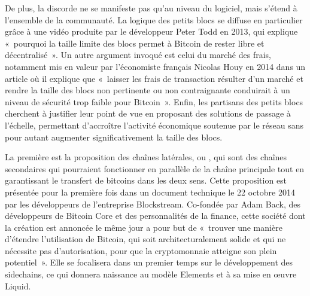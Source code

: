 De plus, la discorde ne se manifeste pas qu'au niveau du logiciel, mais s'étend à l'ensemble de la communauté. La logique des petits blocs se diffuse en particulier grâce à une vidéo produite par le développeur Peter Todd en 2013, qui explique «~pourquoi la taille limite des blocs permet à Bitcoin de rester libre et décentralisé~». Un autre argument invoqué est celui du marché des frais, notamment mis en valeur par l'économiste français Nicolas Houy en 2014 dans un article où il explique que «~laisser les frais de transaction résulter d'un marché et rendre la taille des blocs non pertinente ou non contraignante conduirait à un niveau de sécurité trop faible pour Bitcoin~». Enfin, les partisans des petits blocs cherchent à justifier leur point de vue en proposant des solutions de passage à l'échelle, permettant d'accroître l'activité économique soutenue par le réseau sans pour autant augmenter significativement la taille des blocs.

La première est la proposition des chaînes latérales, ou , qui sont des chaînes secondaires qui pourraient fonctionner en parallèle de la chaîne principale tout en garantissant le transfert de bitcoins dans les deux sens. Cette proposition est présentée pour la première fois dans un document technique le 22 octobre 2014 par les développeurs de l'entreprise Blockstream. Co-fondée par Adam Back, des développeurs de Bitcoin Core et des personnalités de la finance, cette société dont la création est annoncée le même jour a pour but de «~trouver une manière d'étendre l'utilisation de Bitcoin, qui soit architecturalement solide et qui ne nécessite pas d'autorisation, pour que la cryptomonnaie atteigne son plein potentiel~». Elle se focalisera dans un premier temps sur le développement des sidechains, ce qui donnera naissance au modèle Elements et à sa mise en œuvre Liquid.

